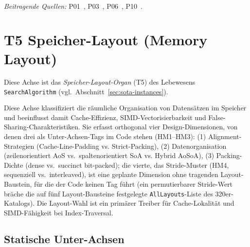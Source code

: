 \begin{scriptsize}
\begin{longtable}{@{}>{\raggedright\arraybackslash}p{3.0cm} >{\raggedright\arraybackslash}p{8.5cm} >{\raggedright\arraybackslash}p{2.0cm}@{}}
\bottomrule
\end{longtable}
\end{scriptsize}

\emph{Beitragende Quellen:} P01~\cite{leis2013art}, P03~\cite{mao2012masstree}, P06~\cite{schmeisser2022b2tree}, P10~\cite{zhang2018surf}.

\section{T5 Speicher-Layout (Memory Layout)}

Diese Achse ist das \emph{Speicher-Layout-Organ} (T5) des Lebewesens \texttt{SearchAlgorithm} (vgl.\ Abschnitt~\ref{sec:sota-instances}).

Diese Achse klassifiziert die räumliche Organisation von Datensätzen im Speicher und beeinflusst damit Cache-Effizienz, SIMD-Vectorisierbarkeit und False-Sharing-Charakteristiken. Sie erfasst orthogonal vier Design-Dimensionen, von denen drei als Unter-Achsen-Tags im Code stehen (HM1--HM3): (1) Alignment-Strategien (Cache-Line-Padding vs. Strict-Packing), (2) Datenorganisation (zeilenorientiert Ao\allowbreak{}S vs.\ spaltenorientiert So\allowbreak{}A vs. Hybrid Ao\allowbreak{}So\allowbreak{}A), (3) Packing-Dichte (dense vs.\ succinct bit-packed); die vierte, das Stride-Muster (HM4, sequenziell vs.\ interleaved), ist eine geplante Dimension ohne tragenden Layout-Baustein, für die der Code keinen Tag führt (ein permutierbarer Stride-Wert bräche die auf fünf Layout-Bausteine festgelegte \texttt{All\allowbreak{}Layouts}-Liste des 320er-Katalogs). Die Layout-Wahl ist ein primärer Treiber für Cache-Lokalität und SIMD-Fähigkeit bei Index-Traversal.

\subsection*{Statische Unter-Achsen}


